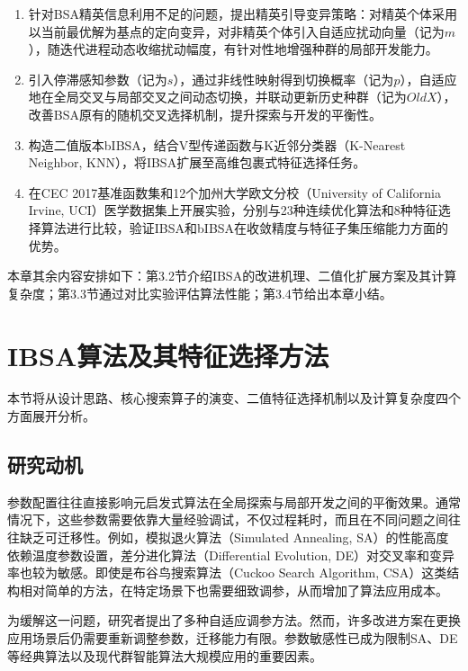 \begin{enumerate}
\item 针对BSA精英信息利用不足的问题，提出精英引导变异策略：对精英个体采用以当前最优解为基点的定向变异，对非精英个体引入自适应扰动向量（记为$m$），随迭代进程动态收缩扰动幅度，有针对性地增强种群的局部开发能力。

\item 引入停滞感知参数（记为$s$），通过非线性映射得到切换概率（记为$p$），自适应地在全局交叉与局部交叉之间动态切换，并联动更新历史种群（记为$OldX$），改善BSA原有的随机交叉选择机制，提升探索与开发的平衡性。

\item 构造二值版本bIBSA，结合V型传递函数与K近邻分类器（K-Nearest Neighbor, KNN），将IBSA扩展至高维包裹式特征选择任务。

\item 在CEC 2017基准函数集和12个加州大学欧文分校（University of California Irvine, UCI）医学数据集上开展实验，分别与23种连续优化算法和8种特征选择算法进行比较，验证IBSA和bIBSA在收敛精度与特征子集压缩能力方面的优势。
\end{enumerate}

本章其余内容安排如下：第3.2节介绍IBSA的改进机理、二值化扩展方案及其计算复杂度；第3.3节通过对比实验评估算法性能；第3.4节给出本章小结。


\section{IBSA算法及其特征选择方法}

本节将从设计思路、核心搜索算子的演变、二值特征选择机制以及计算复杂度四个方面展开分析。


\subsection{研究动机}

参数配置往往直接影响元启发式算法在全局探索与局部开发之间的平衡效果。通常情况下，这些参数需要依靠大量经验调试，不仅过程耗时\cite{ibsa_ref65}，而且在不同问题之间往往缺乏可迁移性。例如，模拟退火算法（Simulated Annealing, SA）的性能高度依赖温度参数设置，差分进化算法（Differential Evolution, DE）对交叉率和变异率也较为敏感。即使是布谷鸟搜索算法（Cuckoo Search Algorithm, CSA）\cite{ibsa_ref66}这类结构相对简单的方法，在特定场景下也需要细致调参，从而增加了算法应用成本。

为缓解这一问题，研究者提出了多种自适应调参方法。然而，许多改进方案在更换应用场景后仍需要重新调整参数，迁移能力有限。参数敏感性已成为限制SA、DE等经典算法以及现代群智能算法大规模应用的重要因素。

